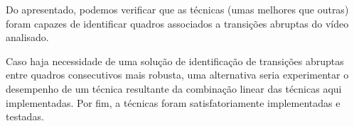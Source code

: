 \documentclass{article}
\begin{document}
Do apresentado, podemos verificar que as técnicas (umas melhores que outras) foram capazes de identificar quadros associados a transições abruptas do vídeo analisado. 

Caso haja necessidade de uma solução de identificação de transições abruptas entre quadros consecutivos mais robusta, uma alternativa seria experimentar o desempenho de um técnica resultante da combinação linear das técnicas aqui implementadas. Por fim, a técnicas foram satisfatoriamente implementadas e testadas.
\end{document}
